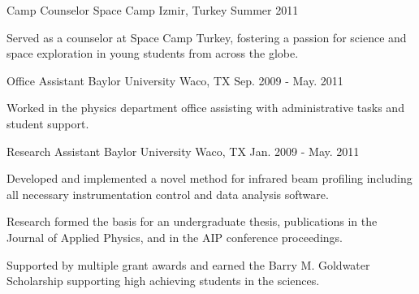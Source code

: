 \begin{cventries}
    \vspace{1em}

    \cventry
        {Camp Counselor} %
        {Space Camp} %
        {Izmir, Turkey} %
        {Summer 2011} %
        {
        \begin{cvitems} %
            \item {Served as a counselor at Space Camp Turkey, fostering a passion for science and space exploration in young students from across the globe.}
        \end{cvitems}
        }

    \vspace{1em}

    \cventry
        {Office Assistant} %
        {Baylor University} %
        {Waco, TX} %
        {Sep. 2009 - May. 2011} %
        {
        \begin{cvitems} %
            \item {Worked in the physics department office assisting with administrative tasks and student support.}
        \end{cvitems}
        }

    \vspace{1em}

    \cventry
        {Research Assistant} %
        {Baylor University} %
        {Waco, TX} %
        {Jan. 2009 - May. 2011} %
        {
        \begin{cvitems} %
            \item {Developed and implemented a novel method for infrared beam profiling including all necessary instrumentation control and data analysis software.}
            \item {Research formed the basis for an undergraduate thesis, publications in the Journal of Applied Physics, and in the AIP conference proceedings.}
            \item {Supported by multiple grant awards and earned the Barry M. Goldwater Scholarship supporting high achieving students in the sciences.}
        \end{cvitems}
        }

    \vspace{1em}


\end{cventries}
